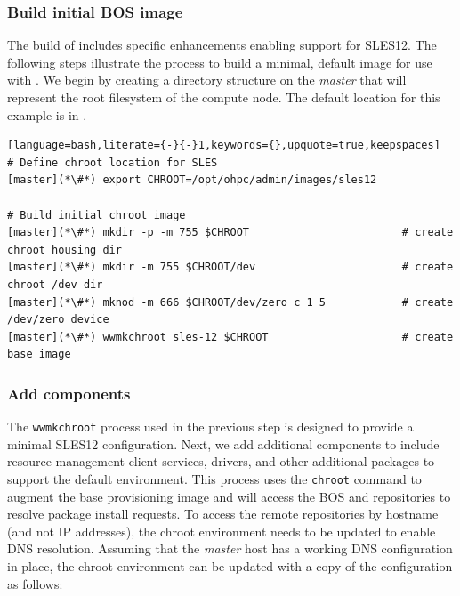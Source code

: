 \documentclass[letterpaper]{article}
\newcommand{\baseOS}{SLES12}
\begin{document}
\subsubsection{Build initial BOS image} \label{sec:assemble_bos}

The \OHPC{} build of \Warewulf{} includes specific enhancements enabling support for
\baseOS{}. The following steps illustrate the process to build a minimal, default
image for use with \Warewulf{}.  We begin by creating a directory structure on the 
{\em master} that will represent the root filesystem of the compute node. The 
default location for this example is in .

\begin{lstlisting}[language=bash,literate={-}{-}1,keywords={},upquote=true,keepspaces]
# Define chroot location for SLES 
[master](*\#*) export CHROOT=/opt/ohpc/admin/images/sles12

# Build initial chroot image
[master](*\#*) mkdir -p -m 755 $CHROOT                        # create chroot housing dir
[master](*\#*) mkdir -m 755 $CHROOT/dev                       # create chroot /dev dir
[master](*\#*) mknod -m 666 $CHROOT/dev/zero c 1 5            # create /dev/zero device
[master](*\#*) wwmkchroot sles-12 $CHROOT                     # create base image
\end{lstlisting}

\subsubsection{Add \OHPC{} components} \label{sec:add_components}

The \texttt{wwmkchroot} process used in the previous step is designed to
provide a minimal \baseOS{} configuration. Next, we add additional components to
include resource management client services, \InfiniBand{} drivers, and other
additional packages to support the default \OHPC{} environment.  This process uses
the \texttt{chroot} command to augment the base provisioning image and will
access the BOS and \OHPC{} repositories to resolve package install requests. To
access the remote repositories by hostname (and not IP addresses), the chroot
environment needs to be updated to enable DNS resolution. Assuming that
the {\em master} host has a working DNS configuration in place, the chroot environment can
be updated with a copy of the configuration as follows:
\end{document}
